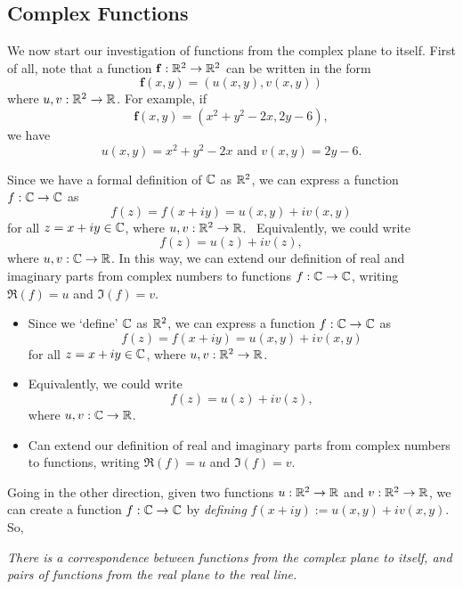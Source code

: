 \subsection{Complex Functions}

We now start our investigation of functions from the complex plane to itself.  First of all, note that a function $\mathbf{f}:\mathbb{R}^2 \to \mathbb{R}^2$ can be written in the form
\[
\mathbf{f}(x,y)=\left( u(x,y), v (x,y) \right)
\]
where $u,v:\mathbb{R}^2 \to \mathbb{R}$.  For example, if
\[
\mathbf{f}(x,y)=\left(x^2+y^2-2x,2y-6 \right),
\]
we have
\[
u(x,y)=x^2+y^2-2x \text{ and } v(x,y)= 2y-6.
\]





Since we have a formal definition of $\mathbb{C}$ as $\mathbb{R}^2$, we can express a function $f : \mathbb{C} \to \mathbb{C}$ as
\begin{equation*}
f(z) = f(x+iy) = u(x,y) +i v(x,y)
\end{equation*}
for all $z =x+iy \in \mathbb{C}$, where $u, v : \mathbb{R}^2 \to \mathbb{R}$. \ Equivalently, we could write
\[
f(z) = u(z) + i v(z),
\]
where $u,v: \mathbb{C} \to \mathbb{R}$.   In this way, we can extend our definition of real and imaginary parts from complex numbers to functions $f:\mathbb{C} \to \mathbb{C}$, writing $\Re (f) = u$ and $\Im (f) = v$.

{
\begin{itemize}
\item
Since we `define' $\mathbb{C}$ as $\mathbb{R}^2$, we can express a function $f : \mathbb{C} \to \mathbb{C}$ as
\begin{equation*}
f(z) = f(x+iy) = u(x,y) +i v(x,y)
\end{equation*}
for all $z =x+iy \in \mathbb{C}$, where $u, v : \mathbb{R}^2 \to \mathbb{R}$. 
\item Equivalently, we could write
\[
f(z) = u(z) + i v(z),
\]
where $u,v: \mathbb{C} \to \mathbb{R}$.  
\item Can extend our definition of real and imaginary parts from complex numbers to functions, writing $\Re (f) = u$ and $\Im (f) = v$.
\end{itemize}
}





Going in the other direction, given two functions $u:\mathbb{R}^2 \to \mathbb{R}$ and $v:\mathbb{R}^2 \to \mathbb{R}$, we can create a function $f : \mathbb{C} \to \mathbb{C}$ by \emph{defining} $f(x+iy) := u(x,y) +iv(x,y)$.
So,
\begin{center}
\emph{
 There is a correspondence between functions from the complex plane to itself, and pairs of functions from the real plane to the real line.}
 \end{center}




